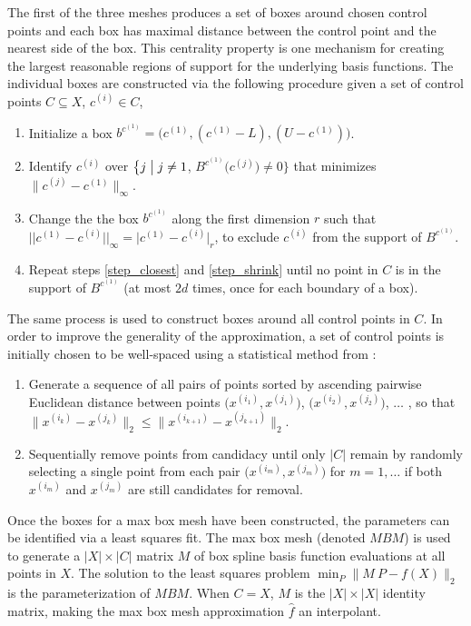 The first of the three meshes produces a set of boxes around chosen control points and each box has maximal distance between the control point and the nearest side of the box. This centrality property is one mechanism for creating the largest reasonable regions of support for the underlying basis functions. The individual boxes are constructed via the following procedure given a set of control points $C \subseteq X$, $c^{(i)} \in C$,
\begin{enumerate}
  \item Initialize a box $b^{c^{(1)}} = \bigl(c^{(1)}, (c^{(1)} - L), (U - c^{(1)})\bigr)$. \label{step_init}
  \item Identify $c^{(i)}$ over $\bigl\{ j \bigm| j \ne 1$, $B^{c^{(1)}}\bigl( c^{(j)} \bigr) \ne 0 \bigr\}$ that minimizes $\bigl\|c^{(j)}-c^{(1)}\bigr\|_\infty$.  \label{step_closest}
  \item Change the the box $b^{c^{(1)}}$ along the first dimension $r$ such that $\bigl|\bigl|c^{(1)} - c^{(i)}\bigr|\bigr|_\infty = \bigl\vert c^{(1)} - c^{(i)}\bigr\vert_r $, to exclude $c^{(i)}$ from the support of $B^{c^{(1)}}$. \label{step_shrink}
  \item Repeat steps \ref{step_closest} and \ref{step_shrink} until no point in $C$ is in the support of $B^{c^{(1)}}$ (at most $2d$ times, once for each boundary of a box).
\end{enumerate}

The same process is used to construct boxes around all control points in $C$. In order to improve the generality of the approximation, a set of control points is initially chosen to be well-spaced using a statistical method from \citet{amos2014algorithm}:

\begin{enumerate}
\item Generate a sequence of all pairs of points sorted by ascending pairwise Euclidean distance between points $\bigl(x^{(i_1)},x^{(j_1)}\bigr)$, $\bigl(x^{(i_2)},x^{(j_2)}\bigr)$, $\ldots$ , so that $\bigl\|x^{(i_k)}-x^{(j_k)}\bigr\|_2 \leq \bigl\|x^{(i_{k+1})}-x^{(j_{k+1})}\bigr\|_2$.
\item Sequentially remove points from candidacy until only $|C|$ remain by randomly selecting a single point from each pair $\bigl(x^{(i_m)}, x^{(j_m)}\bigr)$ for $m = 1,\ldots$ if both $x^{(i_m)}$ and $x^{(j_m)}$ are still candidates for removal.
\end{enumerate}

Once the boxes for a max box mesh have been constructed, the parameters can be identified via a least squares fit. The max box mesh (denoted $MBM$) is used to generate a $|X| \times |C|$ matrix $M$ of box spline basis function evaluations at all points in $X$. The solution to the least squares problem $\min_P \bigl\| M \ P - f(X) \bigr\|_2$ is the parameterization of $MBM$. When $C = X$, $M$ is the $|X| \times |X|$ identity matrix, making the max box mesh approximation $\hat f$ an interpolant.

